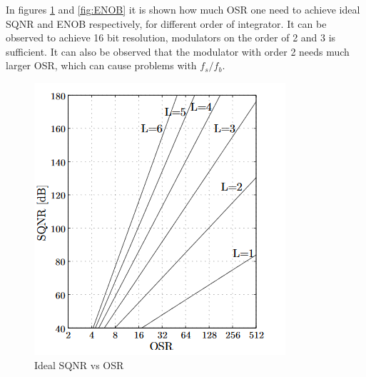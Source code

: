 In figures \ref{fig:SQNR} and \ref{fig:ENOB} it is shown how much OSR one need to achieve ideal SQNR and ENOB respectively, for different order of integrator. It can be observed to achieve 16 bit resolution, modulators on the order of 2 and 3 is sufficient. It can also be observed that the modulator with order 2 needs much larger OSR, which can cause problems with $f_s/f_b$.

\begin{figure}
\begin{minipage}[c]{0.5\linewidth}
\includegraphics[width=\linewidth]{images/OSR_vs_SQNR.png}
\caption{Ideal SQNR vs OSR\cite{SQNR}}
\label{fig:SQNR}
\end{minipage}
\hfill
\begin{minipage}[c]{0.5\linewidth}%

\end{minipage}
\end{figure}
